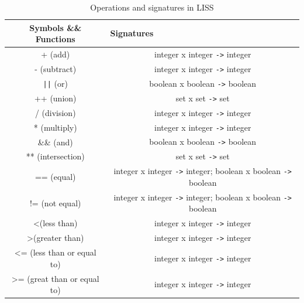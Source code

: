 \documentclass[
  oneside,
  11pt, a4paper,
  footinclude=true,
  headinclude=true,
  cleardoublepage=empty
]{scrbook}
\begin{document}
\begin{table}[]
\centering
\caption{Operations and signatures in LISS}
\label{tbl:type_operations}
\begin{tabular}{|c|c|}
\hline
\textbf{Symbols \&\& Functions} & \multicolumn{1}{l|}{\textbf{Signatures}} \\ \hline
+ (add)                                   & integer x integer \verb+->+ integer                                        \\ \hline
- (subtract)                              & integer x integer \verb+->+ integer                                        \\ \hline
\verb+||+ (or)                            & boolean x boolean  \verb+->+ boolean                                       \\ \hline
++ (union)                                & set x set \verb+->+ set                                                    \\ \hline
/ (division)                              & integer x integer \verb+->+ integer                                        \\ \hline
* (multiply)                              & integer x integer \verb+->+ integer                                        \\ \hline
\&\& (and)                                & boolean x boolean \verb+->+ boolean                                        \\ \hline
** (intersection)                         & set x set \verb+->+ set                                                    \\ \hline
== (equal)                                & integer x integer \verb+->+ integer; boolean x boolean \verb+->+ boolean   \\ \hline
!= (not equal)                            & integer x integer \verb+->+ integer; boolean x boolean \verb+->+ boolean   \\ \hline
\textless  (less than)                    & integer x integer \verb+->+ integer                                        \\ \hline
\textgreater  (greater than)              & integer x integer \verb+->+ integer                                        \\ \hline
\textless= (less than or equal to)        & integer x integer \verb+->+ integer                                        \\ \hline
\textgreater= (great than or equal to)    & integer x integer \verb+->+ integer                                        \\ \hline

\end{tabular}
\end{table}
\end{document}
